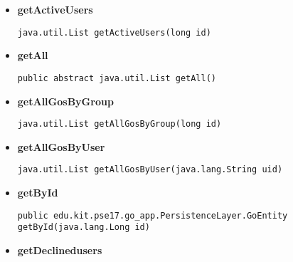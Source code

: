 \documentclass[11pt,a4paper]{report}
\begin{document}
{{{{{{{{{{{{{{\begin{itemize}
{\begin{lstlisting}[frame=none]
java.util.List getActiveGosByUser(java.lang.String uid)\end{lstlisting} %
}%
\item{ 
\hypertarget{edu.kit.pse17.go_app.PersistenceLayer.daos.GroupDaoImp.getActiveUsers(long)}{{\bf  getActiveUsers}\\}
\begin{lstlisting}[frame=none]
java.util.List getActiveUsers(long id)\end{lstlisting} %
}%
\item{ 
\hypertarget{edu.kit.pse17.go_app.PersistenceLayer.daos.GroupDaoImp.getAll()}{{\bf  getAll}\\}
\begin{lstlisting}[frame=none]
public abstract java.util.List getAll()\end{lstlisting} %
}%
\item{ 
\hypertarget{edu.kit.pse17.go_app.PersistenceLayer.daos.GroupDaoImp.getAllGosByGroup(long)}{{\bf  getAllGosByGroup}\\}
\begin{lstlisting}[frame=none]
java.util.List getAllGosByGroup(long id)\end{lstlisting} %
}%
\item{ 
\hypertarget{edu.kit.pse17.go_app.PersistenceLayer.daos.GroupDaoImp.getAllGosByUser(java.lang.String)}{{\bf  getAllGosByUser}\\}
\begin{lstlisting}[frame=none]
java.util.List getAllGosByUser(java.lang.String uid)\end{lstlisting} %
}%
\item{ 
\hypertarget{edu.kit.pse17.go_app.PersistenceLayer.daos.GroupDaoImp.getById(java.lang.Long)}{{\bf  getById}\\}
\begin{lstlisting}[frame=none]
public edu.kit.pse17.go_app.PersistenceLayer.GoEntity getById(java.lang.Long id)\end{lstlisting} %
}%
\item{ 
\hypertarget{edu.kit.pse17.go_app.PersistenceLayer.daos.GroupDaoImp.getDeclinedusers(long)}{{\bf  getDeclinedusers}\\}
}
\end{itemize}}}}}}}}}}}}}}}
\end{document}
